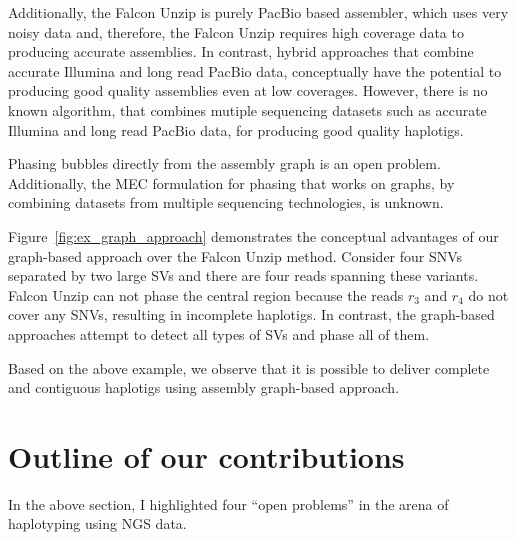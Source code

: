 Additionally, the Falcon Unzip is purely PacBio based assembler, which uses very noisy data and, therefore, the Falcon Unzip requires high coverage data to producing accurate assemblies.
In contrast, hybrid approaches that combine accurate Illumina and long read PacBio data, conceptually have the potential to producing good quality assemblies even at low coverages.
However, there is no known algorithm, that combines mutiple sequencing datasets such as accurate Illumina and long read PacBio data, for producing good quality haplotigs.
\begin{gaps}
 Phasing bubbles directly from the assembly graph is an open problem. Additionally, the MEC formulation for phasing that works on graphs, by combining datasets from multiple sequencing technologies, is unknown. 
 \label{gap:gap4}
\end{gaps}

\begin{example}
Figure~\ref{fig:ex_graph_approach} demonstrates the conceptual advantages of our graph-based approach over the Falcon Unzip method.
Consider four SNVs separated by two large SVs and there are four reads spanning these variants.
Falcon Unzip can not phase the central region because the reads $r_3$ and $r_4$ do not cover any SNVs, resulting in incomplete haplotigs.
In contrast, the graph-based approaches attempt to detect all types of SVs and phase all of them.
\end{example}
Based on the above example, we observe that it is possible to deliver complete and contiguous haplotigs using assembly graph-based approach.

\section{Outline of our contributions}
In the above section, I highlighted four ``open problems'' in the arena of haplotyping using NGS data.

